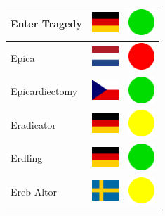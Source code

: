 \documentclass[12pt, a4paper, twoside]{report}
\begin{document}
\begin{center}
\begin{longtable}{|p{5cm}|p{2cm}|p{2cm}|}
Enter Tragedy & \includegraphics[width=1cm]{4x3/de} & \includegraphics[width=1cm]{likes/y} \\ \hline
Epica & \includegraphics[width=1cm]{4x3/nl} & \includegraphics[width=1cm]{likes/n} \\ \hline
Epicardiectomy & \includegraphics[width=1cm]{4x3/cz} & \includegraphics[width=1cm]{likes/y} \\ \hline
Eradicator & \includegraphics[width=1cm]{4x3/de} & \includegraphics[width=1cm]{likes/m} \\ \hline
Erdling & \includegraphics[width=1cm]{4x3/de} & \includegraphics[width=1cm]{likes/y} \\ \hline
Ereb Altor & \includegraphics[width=1cm]{4x3/se} & \includegraphics[width=1cm]{likes/m} \\ \hline

\end{longtable}
\end{center}
\end{document}
